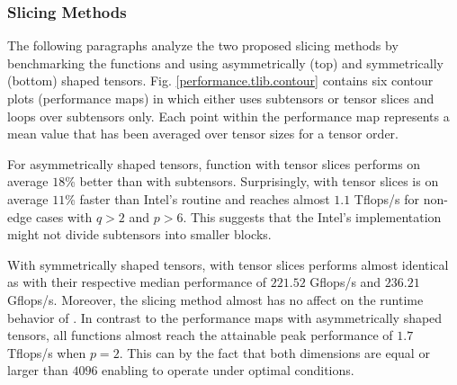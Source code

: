 

\subsubsection{Slicing Methods}
The following paragraphs analyze the two proposed slicing methods by benchmarking the functions  and  using asymmetrically (top) and symmetrically (bottom) shaped tensors.
Fig. \ref{performance.tlib.contour} contains six contour plots (performance maps) in which  either uses subtensors or tensor slices and  loops over subtensors only.
Each point within the performance map represents a mean value that has been averaged over tensor sizes for a tensor order.

For asymmetrically shaped tensors, function  with tensor slices performs on average $18$\% better than with subtensors. %
Surprisingly,  with tensor slices is on average $11$\% faster than Intel's  routine and reaches almost $1.1$ Tflops/s for non-edge cases with $q>2$ and $p > 6$.
This suggests that the Intel's implementation might not divide subtensors into smaller blocks.

With symmetrically shaped tensors,  with tensor slices performs almost identical as  with their respective median performance of $221.52$ Gflops/s and $236.21$ Gflops/s.
Moreover, the slicing method almost has no affect on the runtime behavior of .
In contrast to the performance maps with asymmetrically shaped tensors, all functions almost reach the attainable peak performance of $1.7$ Tflops/s when $p=2$.
This can by the fact that both dimensions are equal or larger than $4096$ enabling  to operate under optimal conditions.

